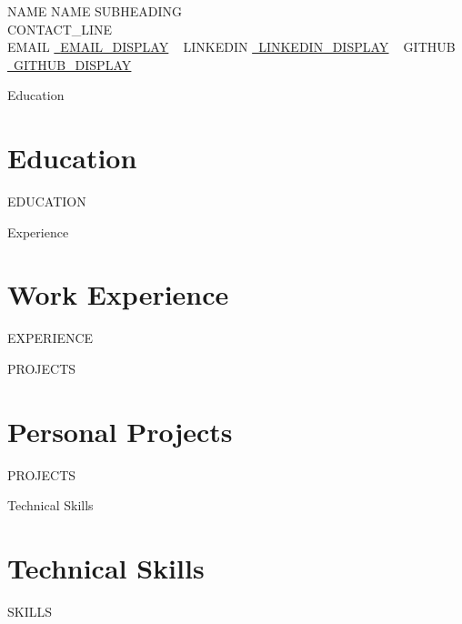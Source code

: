 \documentclass[letterpaper,11pt]{article}
\newcommand{\resumeSubHeadingListStart}{\begin{itemize}[leftmargin=0.0in, label={}]}
\newcommand{\resumeSubHeadingListEnd}{\end{itemize}}
\begin{document}
    \begin{center}
          NAME
        {\Huge\scshape {{NAME}}}
          SUBHEADING
        \\ {{CONTACT_LINE}}\\
        \small
          EMAIL
        \href{mailto:{{EMAIL_URL}}}{\raisebox{-0.2\height}\faEnvelope\  \underline{{{EMAIL_DISPLAY}}}} ~
          LINKEDIN
        \href{{{LINKEDIN_URL}}}{\raisebox{-0.2\height}\faLinkedin\ \underline{{{LINKEDIN_DISPLAY}}}}  ~
          GITHUB
        \href{{{GITHUB_URL}}}{\raisebox{-0.2\height}\faGithub\ \underline{{{GITHUB_DISPLAY}}}}
    \end{center}

                              Education                              
\section{Education}
  \resumeSubHeadingListStart
{{EDUCATION}}
  \resumeSubHeadingListEnd

                              Experience                              
\section{Work Experience}
  \resumeSubHeadingListStart
{{EXPERIENCE}}
  \resumeSubHeadingListEnd

                              PROJECTS                              
\section{Personal Projects}
\resumeSubHeadingListStart
{{PROJECTS}}
\resumeSubHeadingListEnd

                              Technical Skills                              
\section{Technical Skills}
\vspace{-7pt}
\begin{itemize}
[leftmargin=0.15in, label={}]\small{\item{
{{SKILLS}}
}}
\end{itemize}
\end{document}
